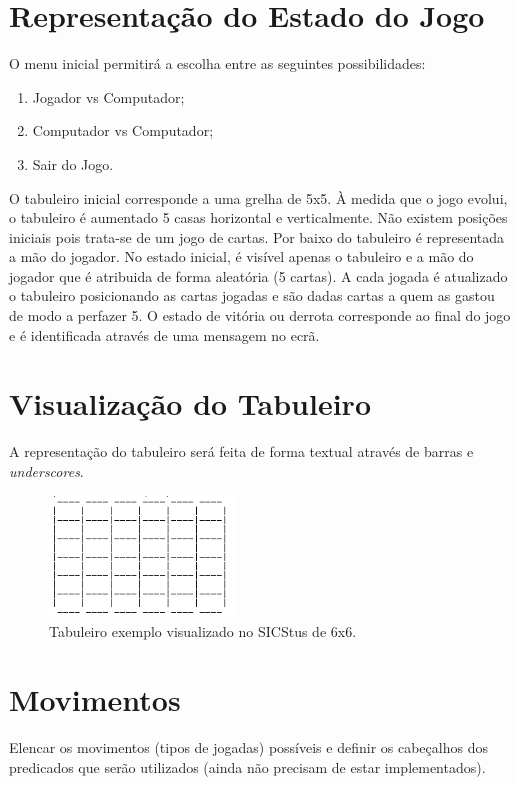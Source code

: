 \documentclass[a4paper]{article}
\begin{document}
\section{Representação do Estado do Jogo}

O menu inicial permitirá a escolha entre as seguintes possibilidades:

\begin{enumerate}
	\item Jogador vs Computador;
	\item Computador vs Computador;
	\item Sair do Jogo. 
\end{enumerate}

\par
O tabuleiro inicial corresponde a uma grelha de 5x5. À medida que o jogo evolui, o tabuleiro é aumentado 5 casas horizontal e verticalmente. Não existem posições iniciais pois trata-se de um jogo de cartas. Por baixo do tabuleiro é representada a mão do jogador. No estado inicial, é visível apenas o tabuleiro e a mão do jogador que é atribuida de forma aleatória (5 cartas). A cada jogada é atualizado o tabuleiro posicionando as cartas jogadas e são dadas cartas a quem as gastou de modo a perfazer 5. O estado de vitória ou derrota corresponde ao final do jogo e é identificada através de uma mensagem no ecrã.

\section{Visualização do Tabuleiro}

A representação do tabuleiro será feita de forma textual através de barras e \textit{underscores}.

\begin{figure}[h!]
\centering
\includegraphics[width=50mm]{board.jpg}
\caption{Tabuleiro exemplo visualizado no SICStus de 6x6. \label{board}}
\end{figure}

\section{Movimentos}

Elencar os movimentos (tipos de jogadas) possíveis e definir os cabeçalhos dos predicados que serão utilizados (ainda não precisam de estar implementados).
\end{document}
